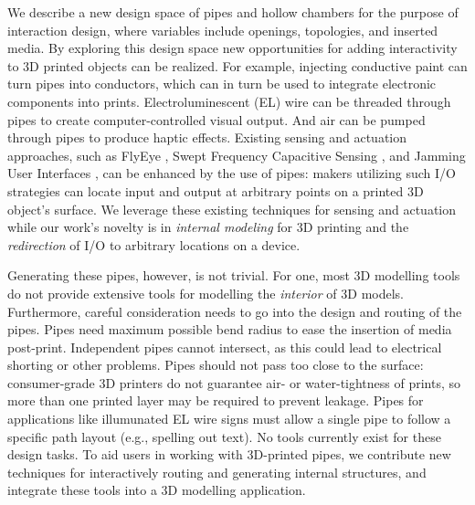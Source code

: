We describe a new design space of pipes and hollow chambers for the purpose of interaction design, where variables include openings, topologies, and inserted media. By exploring this design space new opportunities for adding interactivity to 3D printed objects can be realized. For example, injecting conductive paint can turn pipes into conductors, which can in turn be used to integrate electronic components into prints. Electroluminescent (EL) wire can be threaded through pipes to create computer-controlled visual output. And air can be pumped through pipes to produce haptic effects.  Existing sensing and actuation approaches, such as FlyEye \cite{Wimmer-flyeye}, Swept Frequency Capacitive Sensing \cite{Sato-touche}, and Jamming User Interfaces \cite{Follmer-jamming}, can be enhanced by the use of pipes: makers utilizing such I/O strategies can locate input and output at arbitrary points on a printed 3D object's surface.  We leverage these existing techniques for sensing and actuation while our work's novelty is in \emph{internal modeling} for 3D printing and the \emph{redirection} of I/O to arbitrary locations on a device.


Generating these pipes, however, is not trivial.  For one, most 3D modelling tools do not provide extensive tools for modelling the  {\em interior} of 3D models. Furthermore, careful consideration needs to go into the design and routing of the pipes. Pipes need maximum possible bend radius to ease the insertion of media post-print.  Independent pipes cannot intersect, as this could lead to electrical shorting or other problems.  Pipes should not pass too close to the surface: consumer-grade 3D printers do not guarantee air- or water-tightness of prints, so more than one printed layer may be required to prevent leakage.  Pipes for applications like illumunated EL wire signs must allow a single pipe to follow a specific path layout (e.g., spelling out text).  No tools currently exist for these design tasks. To aid users in working with 3D-printed pipes, we contribute new techniques for interactively routing and generating internal structures, and integrate these tools into a 3D modelling application. 


